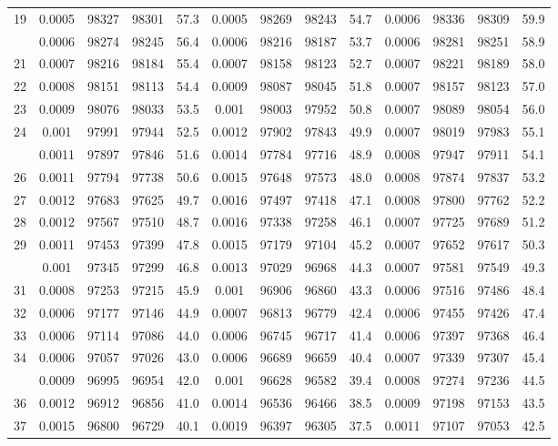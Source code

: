 \documentclass[
  14pt,
]{article}
\begin{document}
\begin{longtable}[t]{lcccccccccccc}
19 & 0.0005 & 98327 & 98301 & 57.3 & 0.0005 & 98269 & 98243 & 54.7 & 0.0006 & 98336 & 98309 & 59.9\\
\addlinespace
20 & 0.0006 & 98274 & 98245 & 56.4 & 0.0006 & 98216 & 98187 & 53.7 & 0.0006 & 98281 & 98251 & 58.9\\
21 & 0.0007 & 98216 & 98184 & 55.4 & 0.0007 & 98158 & 98123 & 52.7 & 0.0007 & 98221 & 98189 & 58.0\\
22 & 0.0008 & 98151 & 98113 & 54.4 & 0.0009 & 98087 & 98045 & 51.8 & 0.0007 & 98157 & 98123 & 57.0\\
23 & 0.0009 & 98076 & 98033 & 53.5 & 0.001 & 98003 & 97952 & 50.8 & 0.0007 & 98089 & 98054 & 56.0\\
24 & 0.001 & 97991 & 97944 & 52.5 & 0.0012 & 97902 & 97843 & 49.9 & 0.0007 & 98019 & 97983 & 55.1\\
\addlinespace
25 & 0.0011 & 97897 & 97846 & 51.6 & 0.0014 & 97784 & 97716 & 48.9 & 0.0008 & 97947 & 97911 & 54.1\\
26 & 0.0011 & 97794 & 97738 & 50.6 & 0.0015 & 97648 & 97573 & 48.0 & 0.0008 & 97874 & 97837 & 53.2\\
27 & 0.0012 & 97683 & 97625 & 49.7 & 0.0016 & 97497 & 97418 & 47.1 & 0.0008 & 97800 & 97762 & 52.2\\
28 & 0.0012 & 97567 & 97510 & 48.7 & 0.0016 & 97338 & 97258 & 46.1 & 0.0007 & 97725 & 97689 & 51.2\\
29 & 0.0011 & 97453 & 97399 & 47.8 & 0.0015 & 97179 & 97104 & 45.2 & 0.0007 & 97652 & 97617 & 50.3\\
\addlinespace
30 & 0.001 & 97345 & 97299 & 46.8 & 0.0013 & 97029 & 96968 & 44.3 & 0.0007 & 97581 & 97549 & 49.3\\
31 & 0.0008 & 97253 & 97215 & 45.9 & 0.001 & 96906 & 96860 & 43.3 & 0.0006 & 97516 & 97486 & 48.4\\
32 & 0.0006 & 97177 & 97146 & 44.9 & 0.0007 & 96813 & 96779 & 42.4 & 0.0006 & 97455 & 97426 & 47.4\\
33 & 0.0006 & 97114 & 97086 & 44.0 & 0.0006 & 96745 & 96717 & 41.4 & 0.0006 & 97397 & 97368 & 46.4\\
34 & 0.0006 & 97057 & 97026 & 43.0 & 0.0006 & 96689 & 96659 & 40.4 & 0.0007 & 97339 & 97307 & 45.4\\
\addlinespace
35 & 0.0009 & 96995 & 96954 & 42.0 & 0.001 & 96628 & 96582 & 39.4 & 0.0008 & 97274 & 97236 & 44.5\\
36 & 0.0012 & 96912 & 96856 & 41.0 & 0.0014 & 96536 & 96466 & 38.5 & 0.0009 & 97198 & 97153 & 43.5\\
37 & 0.0015 & 96800 & 96729 & 40.1 & 0.0019 & 96397 & 96305 & 37.5 & 0.0011 & 97107 & 97053 & 42.5\\

\end{longtable}
\end{document}
